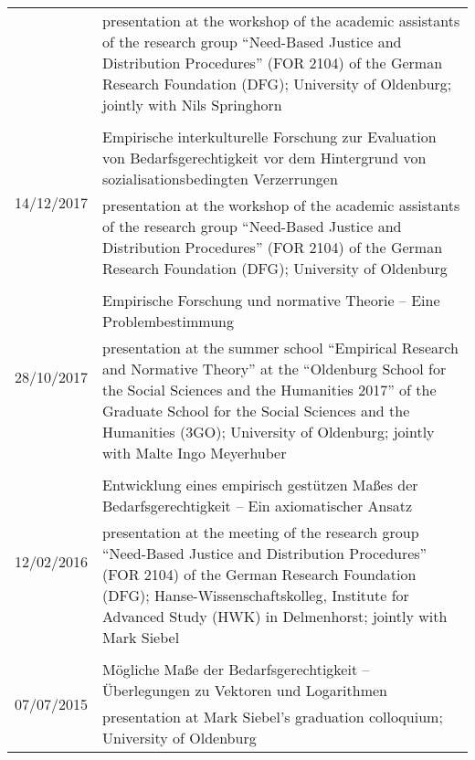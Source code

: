 \documentclass[a4paper,10pt]{article}
\begin{document}
\begin{longtable}{p{}p{11cm}}
& \footnotesize{presentation at the workshop of the academic assistants of the research group \enquote{Need-Based Justice and Distribution Procedures} (FOR 2104) of the German Research Foundation (DFG); University of Oldenburg; jointly with Nils Springhorn}\\
\\
\multirow{2}{2,25cm}{\footnotesize{14/12/2017}} & Empirische interkulturelle Forschung zur Evaluation von Bedarfsgerechtigkeit vor dem Hintergrund von sozialisationsbedingten Verzerrungen\\
& \footnotesize{presentation at the workshop of the academic assistants of the research group \enquote{Need-Based Justice and Distribution Procedures} (FOR 2104) of the German Research Foundation (DFG); University of Oldenburg}\\
\\
\multirow{2}{2,25cm}{\footnotesize{28/10/2017}} & Empirische Forschung und normative Theorie -- Eine Problembestimmung\\
& \footnotesize{presentation at the summer school \enquote{Empirical Research and Normative Theory} at the \enquote{Oldenburg School for the Social Sciences and the Humanities 2017} of the Graduate School for the Social Sciences and the Humanities (3GO); University of Oldenburg; jointly with Malte Ingo Meyerhuber}\\
\\
\multirow{2}{2,25cm}{\footnotesize{12/02/2016}} & Entwicklung eines empirisch gestützen Maßes der Bedarfsgerechtigkeit -- Ein axiomatischer Ansatz\\
& \footnotesize{presentation at the meeting of the research group \enquote{Need-Based Justice and Distribution Procedures} (FOR 2104) of the German Research Foundation (DFG); Hanse-Wissenschaftskolleg, Institute for Advanced Study (HWK) in Delmenhorst; jointly with Mark Siebel}\\
\\
\multirow{2}{2,25cm}{\footnotesize{07/07/2015}} & Mögliche Maße der Bedarfsgerechtigkeit -- Überlegungen zu Vektoren und Logarithmen\\
& \footnotesize{presentation at Mark Siebel's graduation colloquium; University of Oldenburg}\\
\end{longtable}


\clearpage
\end{document}
